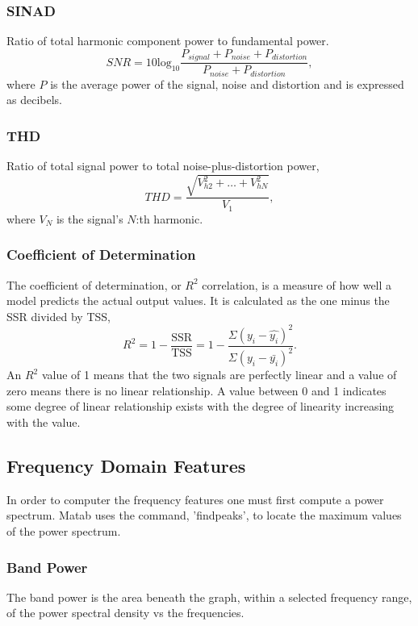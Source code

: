 \documentclass[]{article}
\begin{document}
\subsubsection*{\gls{SINAD}}
Ratio of total harmonic component power to fundamental power.
\begin{equation}
	SNR = 10 \textrm{log}_{10} \frac{P_{signal} + P_{noise} + P_{distortion}}{P_{noise} + P_{distortion}}, 
\end{equation}
where $P$ is the average power of the signal, noise and distortion and is expressed as decibels.
\subsubsection*{\gls{THD}}
Ratio of total signal power to total noise-plus-distortion power,
\begin{equation}
	THD = \frac{\sqrt{V^2_{h2} + \hdots + V^2_{hN}}}{V_1},
\end{equation}
where $V_N$ is the signal's $N$:th harmonic.
\subsubsection*{Coefficient of Determination}
The coefficient of determination, or $R^{2}$ correlation, is a measure of how well a model predicts the actual output values. It is calculated as the one minus the \gls{SSR} divided by \gls{TSS},
\begin{equation}
R^{2} = 1 - \frac{\textrm{SSR}}{\textrm{TSS}} = 1 - \frac{\Sigma(y_i - \hat{y_i})^2}{\Sigma(y_i - \bar{y_i})^2}. 
\end{equation}
An $R^{2}$ value of 1 means that the two signals are perfectly linear and a value of zero means there is no linear relationship. A value between 0 and 1 indicates some degree of linear relationship exists with the degree of linearity increasing with the value.
\subsection{Frequency Domain Features}
In order to computer the frequency features one must first compute a power spectrum. Matab uses the command, 'findpeaks', to locate the maximum values of the power spectrum.
\subsubsection*{Band Power}
The band power is the area beneath the graph, within a selected frequency range, of the power spectral density vs the frequencies.
\end{document}
